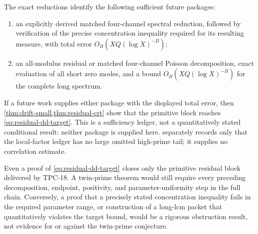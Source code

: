 \begin{remark}
The exact reductions identify the following sufficient future
packages:
\begin{enumerate}[label=\textnormal{(\roman*)}]
 \item an explicitly derived matched four-channel spectral reduction,
 followed by verification of the precise concentration inequality
 required for its resulting measure, with total error
 \(O_B(XQ(\log X)^{-B})\);
 \item an all-modulus residual or matched four-channel Poisson
 decomposition, exact evaluation of all short zero modes, and a bound
 \(O_B(XQ(\log X)^{-B})\) for the complete long spectrum.
\end{enumerate}
If a future work supplies either package with the displayed total
error, then \cref{thm:drift-small,thm:residual-crt} show that the
primitive block reaches \eqref{eq:residual-dd-target}.  This is a
sufficiency ledger, not a quantitatively stated conditional result:
neither package is supplied here.   separately
records only that the local-factor ledger has no large omitted
high-prime tail; it supplies no correlation estimate.
\end{remark}

\begin{remark}
Even a proof of \eqref{eq:residual-dd-target} closes only the primitive
residual block delivered by TPC-18.  A twin-prime theorem would still
require every preceding decomposition, endpoint, positivity, and
parameter-uniformity step in the full chain.  Conversely, a proof that
a precisely stated concentration inequality fails in the required
parameter range, or construction of a long-lcm packet that
quantitatively violates the target bound, would be a rigorous
obstruction result, not evidence for or against the twin-prime
conjecture.
\end{remark}
